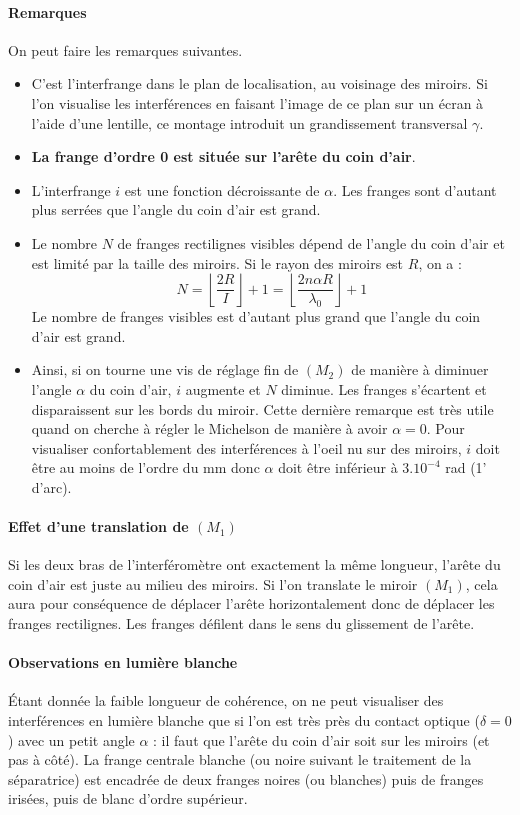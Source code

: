 \documentclass[french]{book}
\theoremstyle{plain}
\theoremstyle{definition}
\theoremstyle{remark}
\begin{document}
\paragraph{Remarques} On peut faire les remarques suivantes.
\begin{itemize}
	\item C'est l'interfrange dans le plan de localisation, au voisinage des miroirs. Si l'on visualise les interférences en faisant l'image de ce plan sur un écran à l'aide d'une lentille, ce montage introduit un grandissement transversal $\gamma$.
	\item \textbf{La frange d'ordre 0 est située sur l'arête du coin d'air}.
	\item L'interfrange $i$ est une fonction décroissante de $\alpha$. Les franges sont d'autant plus serrées que l'angle du coin d'air est grand.
	\item Le nombre $N$ de franges rectilignes visibles dépend de l'angle du coin d'air et est limité par la taille des miroirs. Si le rayon des miroirs est $R$, on a : $$N=\left\lfloor\frac{2R}{I}\right\rfloor+1=\left\lfloor\frac{2n\alpha R}{\lambda_0}\right\rfloor+1$$ Le nombre de franges visibles est d'autant plus grand que l'angle du coin d'air est grand.
	\item Ainsi, si on tourne une vis de réglage fin de $(M_2)$ de manière à diminuer l'angle $\alpha$ du coin d'air, $i$ augmente et $N$ diminue. Les franges s'écartent et disparaissent sur les bords du miroir. Cette dernière remarque est très utile quand on cherche à régler le Michelson de manière à avoir $\alpha=0$. Pour visualiser confortablement des interférences à l'oeil nu sur des miroirs, $i$ doit être au moins de l'ordre du mm donc $\alpha$ doit être inférieur à $3.10^{-4}$ rad (1' d'arc).
\end{itemize}
\paragraph{Effet d'une translation de $(M_1)$} Si les deux bras de l'interféromètre ont exactement la même longueur, l'arête du coin d'air est juste au milieu des miroirs. Si l'on translate le miroir $(M_1)$, cela aura pour conséquence de déplacer l'arête horizontalement donc de déplacer les franges rectilignes. Les franges défilent dans le sens du glissement de l'arête.
\paragraph{Observations en lumière blanche} Étant donnée la faible longueur de cohérence, on ne peut visualiser des interférences en lumière blanche que si l'on est très près du contact optique ($\delta=0$) avec un petit angle $\alpha$ : il faut que l'arête du coin d'air soit sur les miroirs (et pas à côté). La frange centrale blanche (ou noire suivant le traitement de la séparatrice) est encadrée de deux franges noires (ou blanches) puis de franges irisées, puis de blanc d'ordre supérieur.
\end{document}

